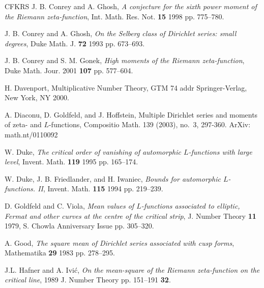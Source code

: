 \documentclass[12pt,letterpaper]{amsart}
\theoremstyle{plain}
\theoremstyle{definition}
\theoremstyle{remark}
\numberwithin{equation}{subsection}
\numberwithin{theorem}{subsection}
\numberwithin{table}{subsection}
\begin{document}
\begin{thebibliography}{CFKRS}
\newblock
 J. B. Conrey and A. Ghosh,  {\it A conjecture for the sixth power moment of the Riemann zeta-function},   Int. Math. Res. Not.
 {\bf 15}   1998
 pp. 775--780.




\newblock
 J. B. Conrey and A. Ghosh,  {\it On the Selberg class of Dirichlet  series: small degrees},   Duke Math. J.
 {\bf 72}   1993
 pp. 673--693.




\newblock
 J. B.  Conrey and S. M.  Gonek,  {\it High moments of the Riemann zeta-function},   Duke Math. Jour.
  2001
 {\bf 107}  pp. 577--604.




\newblock
 H. Davenport,  Multiplicative Number Theory,   GTM 74
 addr  Springer-Verlag, New York, NY
  2000.



\newblock   A. Diaconu, D. Goldfeld, and J. Hoffstein, 
Multiple Dirichlet series and moments of zeta- and $L$-functions,
Compositio Math. 139 (2003), no.~3, 297-360.
ArXiv:  math.nt/0110092 



\newblock W. Duke,
 {\it The critical order of vanishing of automorphic
$L$-functions with large level},   Invent. Math.
 {\bf 119}   1995
 pp.  165--174.




\newblock
 W. Duke, J. B. Friedlander, and H. Iwaniec,  {\it Bounds for
automorphic $L$-functions. II},   Invent. Math.  {\bf  115}  
1994  pp. 219--239.




\newblock
 D. Goldfeld and C. Viola,  {\it  Mean values of $L$-functions associated to elliptic, Fermat and other curves at the centre
of the critical strip},   J.  Number Theory
 {\bf  11}   1979,
S. Chowla Anniversary Issue
 pp. 305--320.




\newblock
 A. Good,  {\it The square mean of Dirichlet series associated with cusp forms},   Mathematika
 {\bf 29}   1983
 pp. 278--295.




\newblock
 J.L. Hafner and A. Ivi\'c,  {\it On the mean-square of the Riemann zeta-function on the critical line},   1989
  J. Number Theory
 pp. 151--191
 {\bf 32}.






\end{thebibliography}
\end{document}
